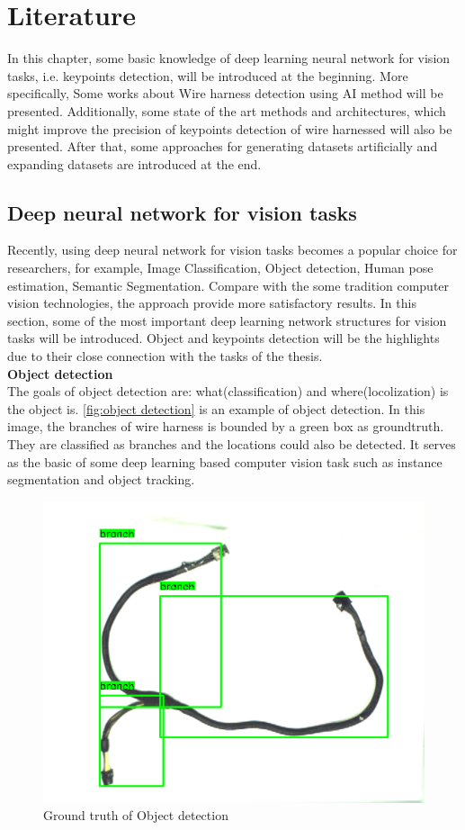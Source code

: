 \chapter{Literature}
    In this chapter, some basic knowledge of deep learning neural network for vision tasks, i.e. keypoints detection, will be introduced at the beginning. 
    More specifically, Some works about Wire harness detection using AI method will be presented. Additionally, some state of the art methods and architectures, 
    which might improve the precision of keypoints detection of wire harnessed will also be presented. After that, some approaches for generating datasets 
    artificially and expanding datasets are introduced at the end.
\section{Deep neural network for vision tasks}
    Recently, using deep neural network for vision tasks becomes a popular choice for researchers, for example, Image Classification\cite{8016501}, 
    Object detection\cite{10028728}, Human pose estimation\cite{Sun_2019_CVPR}, Semantic Segmentation\cite{HAO2020302}. Compare with the some 
    tradition computer vision technologies, the approach provide more satisfactory results\cite{voulodimos2018deep}. 
    In this section, some of the most important deep learning network structures for vision tasks will be introduced. Object and keypoints
    detection will be the highlights due to their close connection with the tasks of the thesis.\\
\textbf{Object detection}\\
    The goals of object detection are: what(classification) and where(locolization) is the object is. \autoref{fig:object detection} is an example of object
    detection. In this image, the branches of wire harness is bounded by a green box as groundtruth. They are classified as branches and the locations could 
    also be detected. It serves as the basic of some deep learning based computer vision task such as instance segmentation and object tracking\cite{10028728}. 
    \begin{figure}
        \centering
        \includegraphics[width=0.6\linewidth]{example_images/object detection}
        \caption{Ground truth of Object detection}
        \label{fig:object detection}
    \end{figure}

